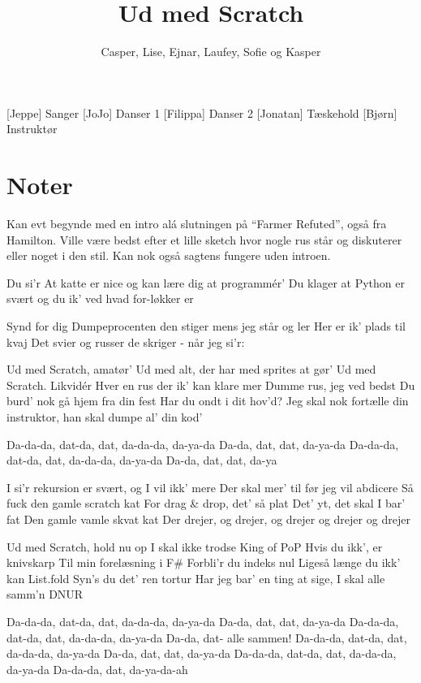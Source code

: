 \documentclass[a4paper,11pt]{article}
\title{Ud med Scratch}
\author{Casper, Lise, Ejnar, Laufey, Sofie og Kasper}
\begin{document}
\maketitle

\begin{roles}
[Jeppe] Sanger
[JoJo] Danser 1
[Filippa] Danser 2
[Jonatan] Tæskehold
[Bjørn] Instruktør
\end{roles} 

\section*{Noter}
Kan evt begynde med en intro alá slutningen på “Farmer Refuted”, også fra Hamilton. Ville være bedst efter et lille sketch hvor nogle rus står og diskuterer eller noget i den stil. Kan nok også sagtens fungere uden introen.



\begin{props}
\prop{}
\end{props}



\begin{song}
 Du si’r
At katte er nice og kan lære dig at programmér’
Du klager
at Python er svært og du ik’ ved hvad for-løkker er


Synd for dig
Dumpeprocenten den stiger mens jeg står og ler
Her er ik’ plads til kvaj
Det svier og russer de skriger - når jeg si’r:

Ud med Scratch, amatør’
Ud med alt, der har med sprites at gør’
Ud med Scratch. Likvidér
Hver en rus der ik’ kan klare mer
Dumme rus, jeg ved bedst
Du burd’ nok gå hjem fra din fest
Har du ondt i dit hov’d?
Jeg skal nok fortælle din instruktor, han skal dumpe al’ din kod’


Da-da-da, dat-da, dat, da-da-da, da-ya-da
Da-da, dat, dat, da-ya-da
Da-da-da, dat-da, dat, da-da-da, da-ya-da
Da-da, dat, dat, da-ya


I si’r rekursion er svært, og I vil ikk’ mere
Der skal mer’ til før jeg vil abdicere
Så fuck den gamle scratch kat
For drag \& drop, det’ så plat
Det’ yt, det skal I bar’ fat
Den gamle vamle skvat kat
Der drejer, og drejer, og drejer og drejer og drejer


Ud med Scratch, hold nu op
I skal ikke trodse King of PoP
Hvis du ikk’, er knivskarp
Til min forelæsning i F\#
Forbli’r du indeks nul
Ligeså længe du ikk’ kan List.fold
Syn’s du det’ ren tortur
Har jeg bar’ en ting at sige, I skal alle samm’n DNUR


Da-da-da, dat-da, dat, da-da-da, da-ya-da
Da-da, dat, dat, da-ya-da
Da-da-da, dat-da, dat, da-da-da, da-ya-da
Da-da, dat- alle sammen!
Da-da-da, dat-da, dat, da-da-da, da-ya-da
Da-da, dat, dat, da-ya-da
Da-da-da, dat-da, dat, da-da-da, da-ya-da
Da-da-da, dat, da-ya-da-ah

\end{song}
\end{document}
